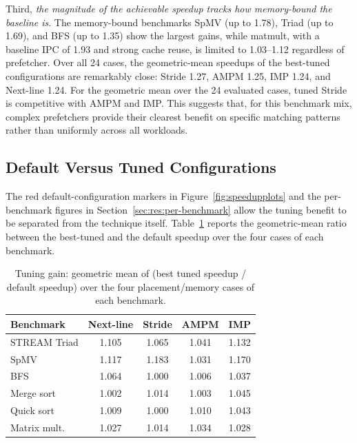 \documentclass[12pt, letterpaper]{article}
\begin{document}
\noindent Third, \emph{the magnitude of the achievable speedup tracks how memory-bound the baseline is}. The memory-bound benchmarks SpMV (up to 1.78), Triad (up to 1.69), and BFS (up to 1.35) show the largest gains, while matmult, with a baseline IPC of 1.93 and strong cache reuse, is limited to 1.03--1.12 regardless of prefetcher. Over all 24 cases, the geometric-mean speedups of the best-tuned configurations are remarkably close: Stride 1.27, AMPM 1.25, IMP 1.24, and Next-line 1.24. For the geometric mean over the 24 evaluated cases, tuned Stride is competitive with AMPM and IMP. This suggests that, for this benchmark mix, complex prefetchers provide their clearest benefit on specific matching patterns rather than uniformly across all workloads.

\subsection{Default Versus Tuned Configurations}
\label{sec:res:defaults}

The red default-configuration markers in Figure~\ref{fig:speedupplots} and the per-benchmark figures in Section~\ref{sec:res:per-benchmark} allow the tuning benefit to be separated from the technique itself. Table~\ref{tab:tuning} reports the geometric-mean ratio between the best-tuned and the default speedup over the four cases of each benchmark.

\begin{table}[tbp]
\caption{Tuning gain: geometric mean of (best tuned speedup / default speedup) over the four placement/memory cases of each benchmark.}
\centering
\begin{tabular}{l|c|c|c|c}
\hline
\textbf{Benchmark} & \textbf{Next-line} & \textbf{Stride} & \textbf{AMPM} & \textbf{IMP} \\ \hline
STREAM Triad & 1.105 & 1.065 & 1.041 & 1.132 \\
SpMV & 1.117 & 1.183 & 1.031 & 1.170 \\ 
BFS & 1.064 & 1.000 & 1.006 & 1.037 \\ 
Merge sort & 1.002 & 1.014 & 1.003 & 1.045 \\ 
Quick sort & 1.009 & 1.000 & 1.010 & 1.043 \\ 
Matrix mult. & 1.027 & 1.014 & 1.034 & 1.028 \\ \hline
\end{tabular}
\label{tab:tuning}
\end{table}
\end{document}
